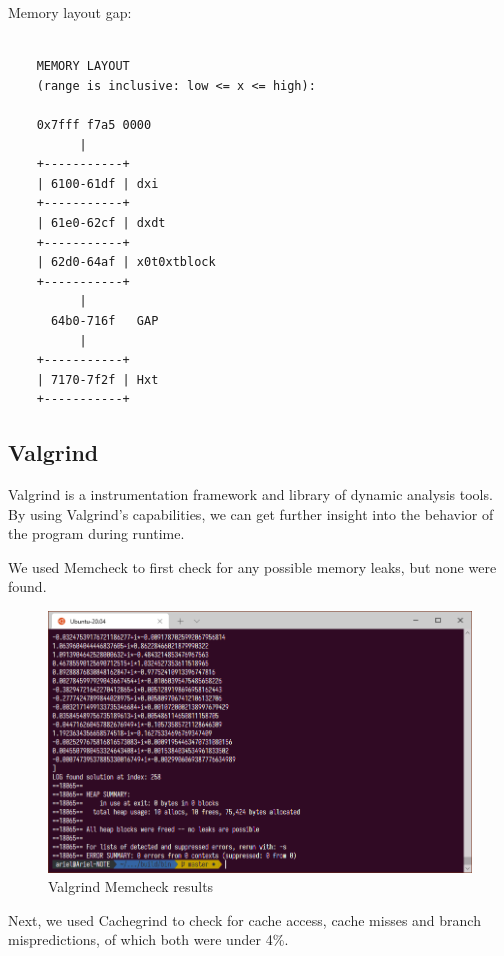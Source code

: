Memory layout gap:
\footnotesize\begin{verbatim}

    MEMORY LAYOUT
    (range is inclusive: low <= x <= high):

    0x7fff f7a5 0000
          |
    +-----------+
    | 6100-61df | dxi
    +-----------+
    | 61e0-62cf | dxdt
    +-----------+
    | 62d0-64af | x0t0xtblock
    +-----------+
          |
      64b0-716f   GAP
          |
    +-----------+
    | 7170-7f2f | Hxt
    +-----------+
\end{verbatim}
\normalsize

\subsection{Valgrind}

Valgrind is a instrumentation framework and library of dynamic analysis tools.
By using Valgrind's capabilities, we can get further insight into the behavior
of the program during runtime.

We used Memcheck to first check for any possible memory leaks, but none were
found.

\begin{figure}[H]
    \includegraphics[width=\columnwidth]{figs/valgrind_memcheck}
    \caption{Valgrind Memcheck results}
\end{figure}

Next, we used Cachegrind to check for cache access, cache misses and branch
mispredictions, of which both were under 4\%.

